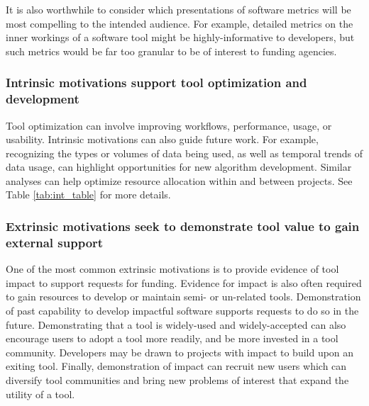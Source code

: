 \documentclass{article}
\begin{document}
It is also worthwhile to consider which presentations of software metrics will be most compelling to the intended audience. For example, detailed metrics on the inner workings of a software tool might be highly-informative to developers, but such metrics would be far too granular to be of interest to funding agencies. 
 


\subsubsection{Intrinsic motivations support tool optimization and development}

Tool optimization can involve improving workflows, performance, usage, or usability. 
Intrinsic motivations can also guide future work. For example, recognizing the types or volumes of data being used, as well as temporal trends of data usage, can highlight opportunities for new algorithm development. Similar analyses can help optimize resource allocation within and between projects. See Table \ref{tab:int_table} for more details.

\subsubsection{Extrinsic motivations seek to demonstrate tool value to gain external support}
 
 One of the most common extrinsic motivations is to provide evidence of tool impact to support requests for funding.  Evidence for impact is also often required to gain resources to develop or maintain semi- or un-related tools. Demonstration of past capability to develop impactful software supports requests to do so in the future.  Demonstrating that a tool is widely-used and widely-accepted can also encourage users to adopt a tool more readily, and be more invested in a tool community. Developers may be drawn to projects with impact to build upon an exiting tool. Finally, demonstration of impact can recruit new users which can diversify tool communities and bring new problems of interest that expand the utility of a tool.
\end{document}
